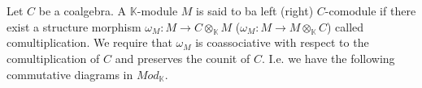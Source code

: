 \documentclass[../thesis.tex]{subfiles}
\begin{document}
            \begin{definition}[Comodules]
                Let $C$ be a coalgebra. A $\mathbb{K}$-module $M$ is said to ba left (right) $C$-comodule if there exist a structure morphism $\omega_M: M \rightarrow C\otimes_{\mathbb{K}}M$ ($\omega_M: M \rightarrow M\otimes_{\mathbb{K}}C$) called comultiplication. We require that $\omega_M$ is coassociative with respect to the comultiplication of $C$ and preserves the counit of $C$. I.e. we have the following commutative diagrams in $Mod_\mathbb{K}$.
                \begin{center}
                \end{center}
                

    
    

    

\end{definition}
\end{document}
